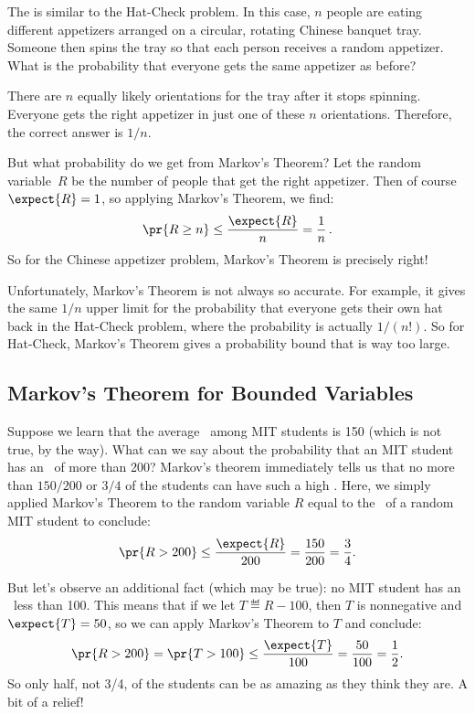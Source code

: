 The  is similar to the Hat-Check
problem.  In this case, $n$ people are eating different appetizers
arranged on a circular, rotating Chinese banquet tray.  Someone then
spins the tray so that each person receives a random appetizer.  What
is the probability that everyone gets the same appetizer as before?

There are $n$ equally likely orientations for the tray after it stops
spinning.  Everyone gets the right appetizer in just one of these $n$
orientations.  Therefore, the correct answer is $1/n$.

But what probability do we get from Markov's Theorem?  Let the random
variable~$R$ be the number of people that get the right appetizer.  
Then of course $\expect{R} = 1$, so
applying Markov's Theorem, we find:
\begin{displaymath}
  \pr{R \geq n} \leq \frac{\expect{R}}{n} = \frac{1}{n}\,.
\end{displaymath}
So for the Chinese appetizer problem, Markov's Theorem is precisely
right!

Unfortunately, Markov's Theorem is not always so accurate.  For
example, it gives the same $1/n$ upper limit for the probability that
everyone gets their own hat back in the Hat-Check problem, where the
probability is actually $1/(n!)$.  So for Hat-Check, Markov's Theorem
gives a probability bound that is way too large.

\subsection{Markov's Theorem for Bounded Variables}

Suppose we learn that the average \IQ\ among MIT students is 150 (which is
not true, by the way).  What can we say about the probability that an MIT
student has an \IQ\ of more than 200?  Markov's theorem immediately tells
us that no more than $150/200$ or $3/4$ of the students can have such a
high \IQ.  Here, we simply applied Markov's Theorem to the random variable
$R$ equal to the \IQ\ of a random MIT student to conclude:
\[
\pr{R > 200} \leq \frac{\expect{R}}{200}= \frac{150}{200} = \frac{3}{4}.
\]

But let's observe an additional fact (which may be true): no MIT student
has an \IQ\ less than 100.  This means that if we let $T \eqdef R-100$,
then $T$ is nonnegative and $\expect{T} = 50$, so we can apply Markov's
Theorem to $T$ and conclude:
\[
\pr{R > 200} = \pr{T > 100} \leq \frac{\expect{T}}{100}= \frac{50}{100} =
\frac{1}{2}.
\]
So only half, not 3/4, of the students can be as amazing as they think
they are.  A bit of a relief!

